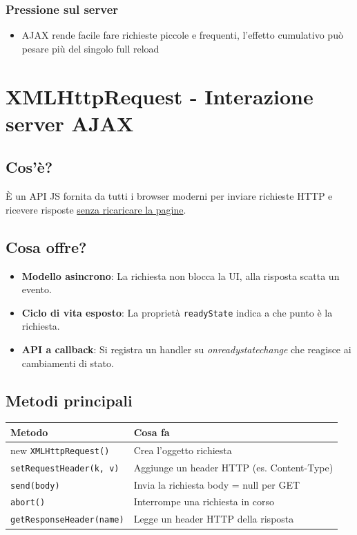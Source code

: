 \subsection{Pressione sul server}
\begin{itemize}
    \item AJAX rende facile fare richieste piccole e frequenti, l'effetto cumulativo può pesare più del singolo full reload
\end{itemize}

\chapter{XMLHttpRequest - Interazione server AJAX}
\section{Cos'è?}
È un API JS fornita da tutti i browser moderni per inviare richieste HTTP e ricevere risposte \uline{senza ricaricare la pagine}.

\section{Cosa offre?}
\begin{itemize}
    \item \textbf{Modello asincrono}: La richiesta non blocca la UI, alla risposta scatta un evento.
    \item \textbf{Ciclo di vita esposto}: La proprietà \texttt{readyState} indica a che punto è la richiesta.
    \item \textbf{API a callback}: Si registra un handler su \textsl{onreadystatechange} che reagisce ai cambiamenti di stato.
\end{itemize}

\section{Metodi principali}
\begin{tabularx}{\linewidth}{|l|X|}
    \hline
    \textbf{Metodo} & \textbf{Cosa fa} \\
    \hline
    new \texttt{XMLHttpRequest()} & Crea l'oggetto richiesta \\
    \hline
    \texttt{setRequestHeader(k, v)} & Aggiunge un header HTTP (es. Content-Type) \\
    \hline
    \texttt{send(body)} & Invia la richiesta body = null per GET \\
    \hline
    \texttt{abort()} & Interrompe una richiesta in corso \\
    \hline
    \texttt{getResponseHeader(name)} & Legge un header HTTP della risposta \\
    \hline
\end{tabularx}

